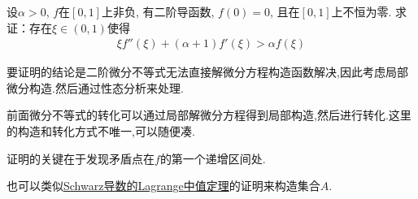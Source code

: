 \documentclass[../../main.tex]{subfiles}%
\begin{document}
\begin{example}
设$\alpha > 0$, $f$在$[0,1]$上非负, 有二阶导函数, $f(0) = 0$, 且在$[0,1]$上不恒为零. 求证：存在$\xi \in (0,1)$使得
\begin{align*}
\xi f''(\xi) + (\alpha + 1)f'(\xi) > \alpha f(\xi)
\end{align*}
\end{example}
\begin{note}
要证明的结论是二阶微分不等式无法直接解微分方程构造函数解决,因此考虑局部微分构造.然后通过性态分析来处理.

前面微分不等式的转化可以通过局部解微分方程得到局部构造,然后进行转化.这里的构造和转化方式不唯一,可以随便凑.

证明的关键在于发现矛盾点在$f$的第一个递增区间处.
\end{note}
\begin{remark}
也可以类似\hyperref[theorem:Schwarz导数的Lagrange中值定理]{Schwarz导数的Lagrange中值定理}的证明来构造集合$A$.
\end{remark}
\end{document}
